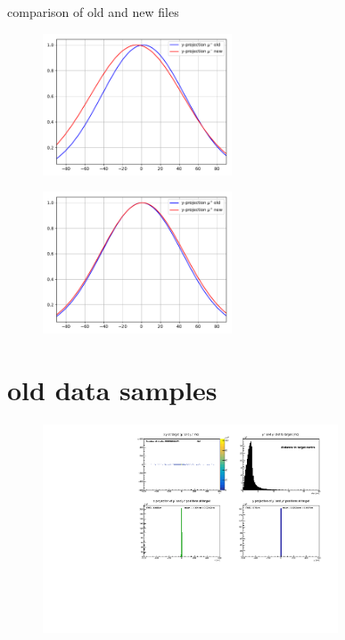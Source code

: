 \begin{frame}[t]{comparison of old and new files}
  \begin{multicols}{2}
    \begin{figure}
      \centering
      \includegraphics[width=0.5\textwidth]{../hists/nofield/comp/gauss_comparison_y-.pdf}
    \end{figure}
    \columnbreak
    \begin{figure}
      \centering
      \includegraphics[width=0.5\textwidth]{../hists/nofield/comp/gauss_comparison_y+.pdf}
    \end{figure}
  \end{multicols}
\end{frame}

\section{old data samples}

\begin{frame}[t]{}
  \begin{figure}
    \centering
    \includegraphics[width=0.78\textwidth]{../hists/nofield/old/mc_target_dist.pdf}
  \end{figure}
\end{frame}

